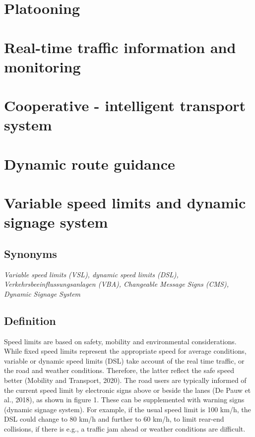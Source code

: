 \documentclass[
]{book}
\begin{document}
\hypertarget{platooning}{%
\section{Platooning}\label{platooning}}

\hypertarget{real-time-traffic-information-and-monitoring}{%
\section{Real-time traffic information and monitoring}\label{real-time-traffic-information-and-monitoring}}

\hypertarget{cooperative---intelligent-transport-system}{%
\section{Cooperative - intelligent transport system}\label{cooperative---intelligent-transport-system}}

\hypertarget{dynamic-route-guidance}{%
\section{Dynamic route guidance}\label{dynamic-route-guidance}}

\hypertarget{variable-speed-limits-and-dynamic-signage-system}{%
\section{Variable speed limits and dynamic signage system}\label{variable-speed-limits-and-dynamic-signage-system}}

\hypertarget{synonyms-4}{%
\subsection*{Synonyms}\label{synonyms-4}}

\emph{Variable speed limits (VSL), dynamic speed limits (DSL), Verkehrsbeeinflussungsanlagen (VBA), Changeable Message Signs (CMS), Dynamic Signage System}

\hypertarget{definition-4}{%
\subsection*{Definition}\label{definition-4}}

Speed limits are based on safety, mobility and environmental considerations. While fixed speed limits represent the appropriate speed for average conditions, variable or dynamic speed limits (DSL) take account of the real time traffic, or the road and weather conditions. Therefore, the latter reflect the safe speed better (Mobility and Transport, 2020). The road users are typically informed of the current speed limit by electronic signs above or beside the lanes (De Pauw et al., 2018), as shown in figure 1. These can be supplemented with warning signs (dynamic signage system). For example, if the usual speed limit is 100 km/h, the DSL could change to 80 km/h and further to 60 km/h, to limit rear-end collisions, if there is e.g., a traffic jam ahead or weather conditions are difficult.
\end{document}
